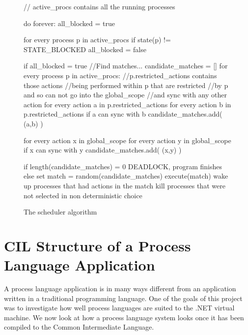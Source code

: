 	\begin{figure}
	\begin{codeblock}
// active_procs contains all the running processes

do forever:
  all_blocked = true
  
  for every process p in active_procs
    if state(p) != STATE_BLOCKED
      all_blocked = false
    
  if all_blocked = true
    //Find matches...      
    candidate_matches = []
    for every process p in active_procs:
      //p.restricted_actions contains those actions
      //being performed within p that are restricted 
      //by p and so can not go into the global_scope 
      //and sync with any other action
      for every action a in p.restricted_actions
        for every action b in p.restricted_actions
          if a can sync with b
            candidate_matches.add( (a,b) )
		
    for every action x in global_scope
      for every action y in global_scope
        if x can sync with y
          candidate_matches.add( (x,y) )
    
    if length(candidate_matches) = 0
    	DEADLOCK, program finishes
    else
      set match = random(candidate_matches)
      execute(match)
      wake up processes that had actions in the match
      kill processes that were not selected 
        in non deterministic choice
	
	\end{codeblock}
	\caption{The scheduler algorithm}
	\label{fig:scheduler}
	\end{figure}
	

\section{CIL Structure of a Process Language Application}\label{cil_structure}

	A process language application is in many ways different from an application
	written in a traditional programming language. One of the goals of this  
	project was to investigate how well process languages are suited to the .NET
	virtual machine. We now look at how a process language system looks once it 
	has been compiled to the Common Intermediate Language.
	
